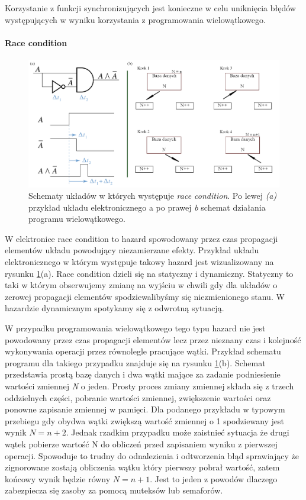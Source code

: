 \documentclass[a4paper,12pt]{article}
\begin{document}
Korzystanie z funkcji synchronizujących jest konieczne w celu uniknięcia błędów występujących w wyniku korzystania z programowania wielowątkowego.

\paragraph{Race condition}

\begin{figure}[t]
        \centering
        \includegraphics[width = \textwidth]{race_condition.png}
        \caption{Schematy układów w których występuje \textit{race condition}. Po lewej \textit{(a)} przykład układu elektronicznego a po prawej \textit{{b}} schemat działania programu wielowątkowego. }
        \label{race condition}
\end{figure}

W elektronice race condition to hazard spowodowany przez czas propagacji elementów układu powodujący niezamierzane efekty. Przykład układu elektronicznego w którym występuje takowy hazard jest wizualizowany na rysunku \ref{race condition}(a). 
Race condition dzieli się na statyczny i dynamiczny. Statyczny to taki w którym obserwujemy zmianę na wyjściu w chwili gdy dla układów o zerowej propagacji elementów spodziewalibyśmy się niezmienionego stanu.
W hazardzie dynamicznym spotykamy się z odwrotną sytuacją. 

W przypadku programowania wielowątkowego tego typu hazard nie jest powodowany przez czas propagacji elementów lecz przez nieznany czas i kolejność wykonywania operacji przez równolegle pracujące wątki. Przykład schematu programu dla takiego przypadku znajduje się na rysunku \ref{race condition}(b). Schemat przedstawia prostą bazę danych i dwa wątki mające za zadanie podniesienie wartości zmiennej \textit{N} o jeden.
Prosty proces zmiany zmiennej składa się z trzech oddzielnych części, pobranie wartości zmiennej, zwiększenie wartości oraz ponowne zapisanie zmiennej w pamięci. 
Dla podanego przykładu w typowym przebiegu gdy obydwa wątki zwiększą wartość zmiennej o 1 spodziewany jest wynik $N = n+2$. Jednak rzadkim przypadku może zaistnieć sytuacja że drugi wątek pobierze wartość N do obliczeń przed zapisaniem wyniku z pierwszej operacji. Spowoduje to trudny do odnalezienia i odtworzenia błąd sprawiający że zignorowane zostają obliczenia wątku który pierwszy pobrał wartość, zatem końcowy wynik będzie równy $N = n+1$.
Jest to jeden z powodów dlaczego zabezpiecza się zasoby za pomocą muteksów lub semaforów. 
\end{document}
